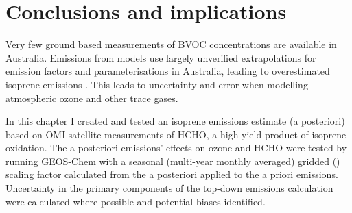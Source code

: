     
    
\section{Conclusions and implications}
  \label{BioIsop:conclusions}
  
  
  
  Very few ground based measurements of BVOC concentrations are available in Australia.
  Emissions from models use largely unverified extrapolations for emission factors and parameterisations in Australia, leading to overestimated isoprene emissions \parencite{Emmerson2016}.
  This leads to uncertainty and error when modelling atmospheric ozone and other trace gases.
  
  In this chapter I created and tested an isoprene emissions estimate (a posteriori) based on OMI satellite measurements of HCHO, a high-yield product of isoprene oxidation.
  The a posteriori emissions' effects on ozone and HCHO were tested by running GEOS-Chem with a seasonal (multi-year monthly averaged) gridded (\lowhr) scaling factor calculated from the a posteriori applied to the a priori emissions.
  Uncertainty in the primary components of the top-down emissions calculation were calculated where possible and potential biases identified.
  
